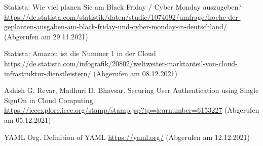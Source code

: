 \begin{thebibliography}{HR08}
  Statista: Wie viel planen Sie am Black Friday / Cyber Monday auszugeben? \\
 \url{https://de.statista.com/statistik/daten/studie/1074692/umfrage/hoehe-der-geplanten-ausgaben-am-black-friday-und-cyber-monday-in-deutschland/}
 (Abgerufen am 29.11.2021) 

  Statista: Amazon ist die Nummer 1 in der Cloud \\
 \url{https://de.statista.com/infografik/20802/weltweiter-marktanteil-von-cloud-infrastruktur-dienstleistern/}
 (Abgerufen am 08.12.2021) 

Ashish G. Revar, Madhuri D. Bhavsar. Securing User Authentication using Single SignOn in Cloud Computing.\\
 \url{https://ieeexplore.ieee.org/stamp/stamp.jsp?tp=&arnumber=6153227}
 (Abgerufen am 05.12.2021) 

YAML Org. Definition of YAML \url{https://yaml.org/}
 (Abgerufen am 12.12.2021)
\end{thebibliography}


